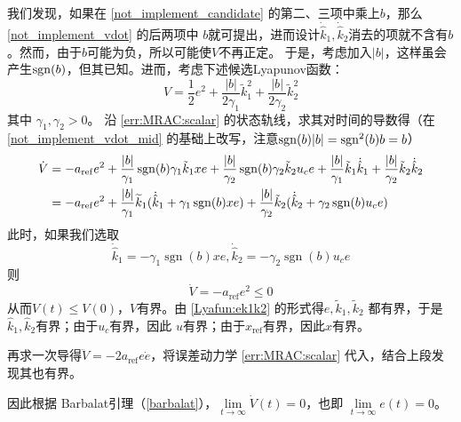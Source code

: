 我们发现，如果在 \eqref{not_implement_candidate} 的第二、三项中乘上$b$，那么 \eqref{not_implement_vdot} 的后两项中
$b$就可提出，进而设计$\dot{\hat{k}}_1,\dot{\hat{k}}_2$消去的项就不含有$b$。然而，由于$b$可能为负，所以可能使$V$不再正定。
于是，考虑加入$|b|$，这样虽会产生$\operatorname{sgn}(b)$，但其已知。进而，考虑下述候选Lyapunov函数：
\begin{equation}
  V = \frac{1}{2} e^2 + \frac{| b |}{2 \gamma_1} \tilde{k}^2_1 + \frac{| b
  |}{2 \gamma_2} \tilde{k}^2_2 \label{Lyafun:ek1k2}
\end{equation}
其中 $\gamma_1, \gamma_2 > 0$。
沿 \eqref{err:MRAC:scalar} 的状态轨线，求其对时间的导数得（在 \eqref{not_implement_vdot_mid} 的基础上改写，注意$\operatorname{sgn}(b)|b|=\operatorname{sgn}^2(b)b=b$）
\begin{align*}
    \dot{V}   &= - a_{\operatorname{ref}} e^2 + \frac{ | b |}{\gamma_1} \operatorname{sgn}(b) \gamma_1 \tilde{k} _1 x  e + \frac{| b |}{\gamma_2} \operatorname{sgn}(b){\gamma_2} 
  \tilde{k} _2 u_c e + \frac{| b |}{\gamma_1}\tilde{k} _1 \dot{\hat{k}}_1 + \frac{| b |}{\gamma_2}\tilde{k} _2
  \dot{\hat{k}}_2 \\
    & = - a_{\operatorname{ref}} e^2 + \frac{| b
   |}{\gamma_1} \widetilde{ k} _1 (\dot{\hat{k}}_1 + \gamma_1
   \operatorname{sgn} (b) x  e) + \frac{| b |}{\gamma_2}
   \tilde{k} _2 (\dot{\hat{k}}_2 + \gamma_2 \operatorname{sgn}
   (b)  u_c e)
\end{align*}
此时，如果我们选取
\begin{equation*}
  \dot{\hat{k}}_1 = -  \gamma_1 \ensuremath{\operatorname{sgn}} (b) x  e,
  \dot{\hat{k}}_2 = -  \gamma_2 \ensuremath{\operatorname{sgn}} (b)  u_c e
\end{equation*}
则
\begin{equation*}
  \dot{V} = - a_{\ensuremath{\operatorname{ref}}} e^2 \leq 0
\end{equation*}
从而$V (t) \leq V (0)$，$V$有界。由 \eqref{Lyafun:ek1k2} 的形式得$e, \tilde{k} _1,
\tilde{k} _2$ 都有界，于是$\hat{k}_1,\hat{k}_2$有界；由于$u_c$有界，因此 $u$有界；由于$x_\mathrm{ref}$有界，因此$x$有界。

再求一次导得$\ddot{V} = - 2a_{\ensuremath{\operatorname{ref}}} e  \dot{e}$，将误差动力学 \eqref{err:MRAC:scalar} 代入，结合上段发现其也有界。

因此根据 Barbalat引理（\ref{barbalat}），$\lim\limits_{t \rightarrow \infty}
\dot{V} (t) = 0$，也即 $\lim\limits_{t \rightarrow \infty} e (t) = 0$。

